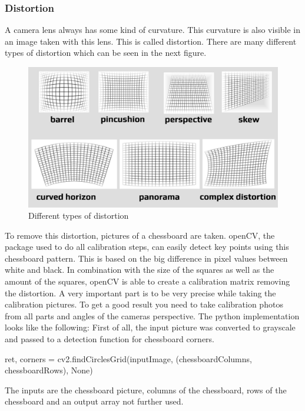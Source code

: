 \documentclass[journal,onecolumn]{IEEEtran}
\begin{document}
\subsubsection{Distortion}
\noindent
A camera lens always has some kind of curvature. This curvature is also visible in an image taken with this lens. This is called distortion. There are many different types of distortion which can be seen in the next figure.
\begin{figure}[H]
	\centering
	\includegraphics[scale=0.3]{distortion.jpg}
	\captionsetup{justification=centering}
	\caption{Different types of distortion}
\end{figure}
\noindent
To remove this distortion, pictures of a chessboard are taken. openCV, the package used to do all calibration steps, can easily detect key points using this chessboard pattern. This is based on the big difference in pixel values between white and black. In combination with the size of the squares as well as the amount of the squares, openCV is able to create a calibration matrix removing the distortion.\newline
A very important part is to be very precise while taking the calibration pictures. To get a good result you need to take calibration photos from all parts and angles of the cameras perspective.\newline
The python implementation looks like the following: \newline
First of all, the input picture was converted to grayscale and passed to a detection function for chessboard corners.
\begin{python}
ret, corners = cv2.findCirclesGrid(inputImage, (chessboardColumns, chessboardRows), None)
\end{python}
The inputs are the chessboard picture, columns of the chessboard, rows of the chessboard and an output array not further used.
\end{document}
